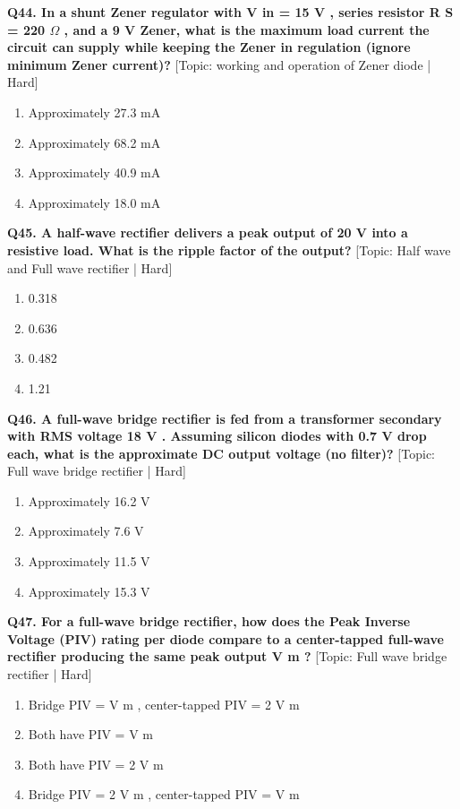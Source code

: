 \noindent\textbf{Q44. In a shunt Zener regulator with V in = 15 V , series resistor R S = 220 $\Omega$ , and a 9 V Zener, what is the maximum load current the circuit can supply while keeping the Zener in regulation (ignore minimum Zener current)?} \hfill [Topic: working and operation of Zener diode | Hard]
\begin{enumerate}[label=(\alph*),topsep=2pt,itemsep=1pt,partopsep=0pt,parsep=0pt]
    \item {Approximately 27.3 mA}
    \item {Approximately 68.2 mA}
    \item {Approximately 40.9 mA}
    \item {Approximately 18.0 mA}
\end{enumerate}
\vspace{2mm}

\noindent\textbf{Q45. A half-wave rectifier delivers a peak output of 20 V into a resistive load. What is the ripple factor of the output?} \hfill [Topic: Half wave and Full wave rectifier | Hard]
\begin{enumerate}[label=(\alph*),topsep=2pt,itemsep=1pt,partopsep=0pt,parsep=0pt]
    \item {0.318}
    \item {0.636}
    \item {0.482}
    \item {1.21}
\end{enumerate}
\vspace{2mm}

\noindent\textbf{Q46. A full-wave bridge rectifier is fed from a transformer secondary with RMS voltage 18 V . Assuming silicon diodes with 0.7 V drop each, what is the approximate DC output voltage (no filter)?} \hfill [Topic: Full wave bridge rectifier | Hard]
\begin{enumerate}[label=(\alph*),topsep=2pt,itemsep=1pt,partopsep=0pt,parsep=0pt]
    \item {Approximately 16.2 V}
    \item {Approximately 7.6 V}
    \item {Approximately 11.5 V}
    \item {Approximately 15.3 V}
\end{enumerate}
\vspace{2mm}

\noindent\textbf{Q47. For a full-wave bridge rectifier, how does the Peak Inverse Voltage (PIV) rating per diode compare to a center-tapped full-wave rectifier producing the same peak output V m ?} \hfill [Topic: Full wave bridge rectifier | Hard]
\begin{enumerate}[label=(\alph*),topsep=2pt,itemsep=1pt,partopsep=0pt,parsep=0pt]
    \item {Bridge PIV = V m , center-tapped PIV = 2 V m}
    \item {Both have PIV = V m}
    \item {Both have PIV = 2 V m}
    \item {Bridge PIV = 2 V m , center-tapped PIV = V m}
\end{enumerate}
\vspace{2mm}

